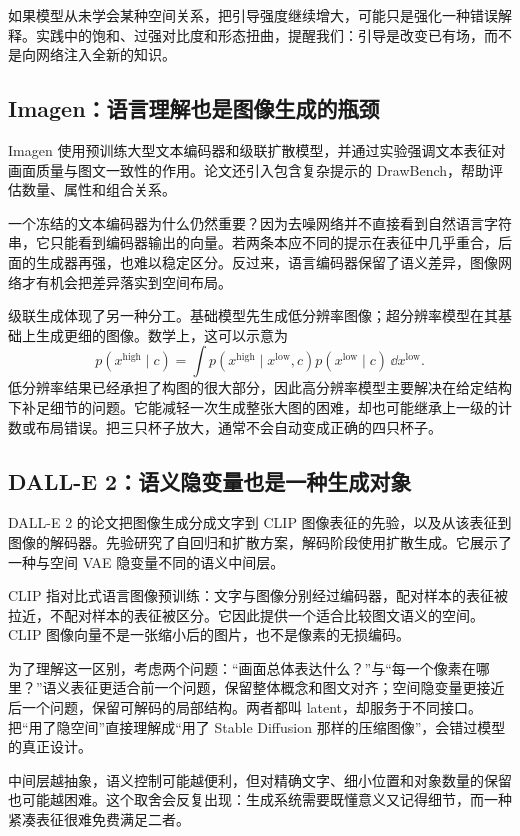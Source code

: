 如果模型从未学会某种空间关系，把引导强度继续增大，可能只是强化一种错误解释。实践中的饱和、过强对比度和形态扭曲，提醒我们：引导是改变已有场，而不是向网络注入全新的知识。

\subsection{Imagen：语言理解也是图像生成的瓶颈}

Imagen 使用预训练大型文本编码器和级联扩散模型，并通过实验强调文本表征对画面质量与图文一致性的作用。论文还引入包含复杂提示的 DrawBench，帮助评估数量、属性和组合关系。\cite{a_imagen}

一个冻结的文本编码器为什么仍然重要？因为去噪网络并不直接看到自然语言字符串，它只能看到编码器输出的向量。若两条本应不同的提示在表征中几乎重合，后面的生成器再强，也难以稳定区分。反过来，语言编码器保留了语义差异，图像网络才有机会把差异落实到空间布局。

级联生成体现了另一种分工。基础模型先生成低分辨率图像；超分辨率模型在其基础上生成更细的图像。数学上，这可以示意为
\[
p(x^{\mathrm{high}}\mid c)
=\int p(x^{\mathrm{high}}\mid x^{\mathrm{low}},c)
        p(x^{\mathrm{low}}\mid c)\,\dd x^{\mathrm{low}}.
\]
低分辨率结果已经承担了构图的很大部分，因此高分辨率模型主要解决在给定结构下补足细节的问题。它能减轻一次生成整张大图的困难，却也可能继承上一级的计数或布局错误。把三只杯子放大，通常不会自动变成正确的四只杯子。

\subsection{DALL-E 2：语义隐变量也是一种生成对象}

DALL-E 2 的论文把图像生成分成文字到 CLIP 图像表征的先验，以及从该表征到图像的解码器。先验研究了自回归和扩散方案，解码阶段使用扩散生成。它展示了一种与空间 VAE 隐变量不同的语义中间层。\cite{a_dalle2}

CLIP 指对比式语言图像预训练：文字与图像分别经过编码器，配对样本的表征被拉近，不配对样本的表征被区分。它因此提供一个适合比较图文语义的空间。\cite{a_clip}CLIP 图像向量不是一张缩小后的图片，也不是像素的无损编码。

为了理解这一区别，考虑两个问题：“画面总体表达什么？”与“每一个像素在哪里？”语义表征更适合前一个问题，保留整体概念和图文对齐；空间隐变量更接近后一个问题，保留可解码的局部结构。两者都叫 latent，却服务于不同接口。把“用了隐空间”直接理解成“用了 Stable Diffusion 那样的压缩图像”，会错过模型的真正设计。

中间层越抽象，语义控制可能越便利，但对精确文字、细小位置和对象数量的保留也可能越困难。这个取舍会反复出现：生成系统需要既懂意义又记得细节，而一种紧凑表征很难免费满足二者。

